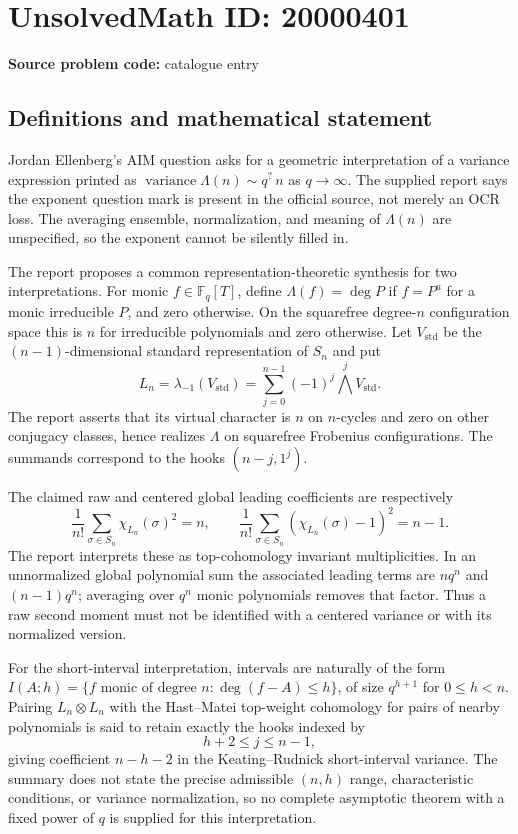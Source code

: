 \documentclass[11pt]{article}
\newcommand{\F}{\mathbb{F}}
\begin{document}
\section*{UnsolvedMath ID: 20000401}
\textbf{Source problem code:} catalogue entry
\subsection{Definitions and mathematical statement}
Jordan Ellenberg's AIM question asks for a geometric interpretation of a variance expression printed as \(\operatorname{variance}\Lambda(n)\sim q^{?}\,n\) as \(q\to\infty\). The supplied report says the exponent question mark is present in the official source, not merely an OCR loss. The averaging ensemble, normalization, and meaning of \(\Lambda(n)\) are unspecified, so the exponent cannot be silently filled in.

The report proposes a common representation-theoretic synthesis for two interpretations. For monic \(f\in\F_q[T]\), define \(\Lambda(f)=\deg P\) if \(f=P^a\) for a monic irreducible \(P\), and zero otherwise. On the squarefree degree-\(n\) configuration space this is \(n\) for irreducible polynomials and zero otherwise. Let \(V_{\mathrm{std}}\) be the \((n-1)\)-dimensional standard representation of \(S_n\) and put
\[
L_n=\lambda_{-1}(V_{\mathrm{std}})
=\sum_{j=0}^{n-1}(-1)^j\bigwedge^jV_{\mathrm{std}}.
\]
The report asserts that its virtual character is \(n\) on \(n\)-cycles and zero on other conjugacy classes, hence realizes \(\Lambda\) on squarefree Frobenius configurations. The summands correspond to the hooks \((n-j,1^j)\).

The claimed raw and centered global leading coefficients are respectively
\[
\frac1{n!}\sum_{\sigma\in S_n}\chi_{L_n}(\sigma)^2=n,\qquad
\frac1{n!}\sum_{\sigma\in S_n}(\chi_{L_n}(\sigma)-1)^2=n-1.
\]
The report interprets these as top-cohomology invariant multiplicities. In an unnormalized global polynomial sum the associated leading terms are \(nq^n\) and \((n-1)q^n\); averaging over \(q^n\) monic polynomials removes that factor. Thus a raw second moment must not be identified with a centered variance or with its normalized version.

For the short-interval interpretation, intervals are naturally of the form \(I(A;h)=\{f\text{ monic of degree }n:\deg(f-A)\leq h\}\), of size \(q^{h+1}\) for \(0\leq h<n\). Pairing \(L_n\otimes L_n\) with the Hast--Matei top-weight cohomology for pairs of nearby polynomials is said to retain exactly the hooks indexed by
\[
h+2\leq j\leq n-1,
\]
giving coefficient \(n-h-2\) in the Keating--Rudnick short-interval variance. The summary does not state the precise admissible \((n,h)\) range, characteristic conditions, or variance normalization, so no complete asymptotic theorem with a fixed power of \(q\) is supplied for this interpretation.
\end{document}
